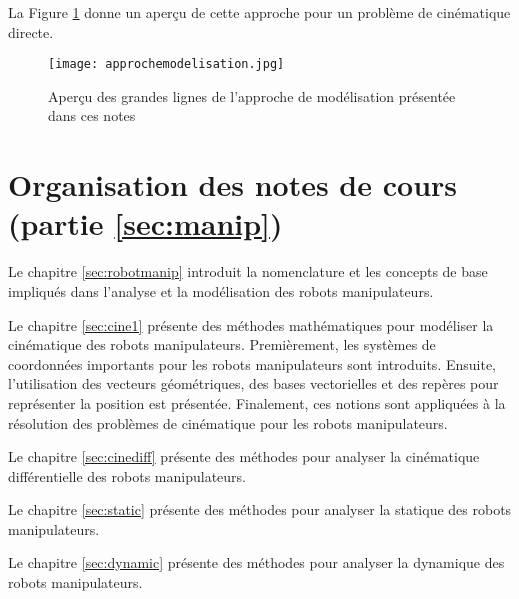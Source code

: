 La Figure \ref{fig:approchemodelisation} donne un aperçu de cette approche pour un problème de cinématique directe.

\begin{figure}[H]
	\centering
	\texttt{[image: approchemodelisation.jpg]}
	\caption{Aperçu des grandes lignes de l'approche de modélisation présentée dans ces notes}
	\label{fig:approchemodelisation}
\end{figure}

\section{Organisation des notes de cours (partie \ref{sec:manip})}

Le chapitre \ref{sec:robotmanip} introduit la nomenclature et les concepts de base impliqués dans l'analyse et la modélisation des robots manipulateurs.

Le chapitre \ref{sec:cine1} présente des méthodes mathématiques pour modéliser la cinématique des robots manipulateurs. Premièrement, les systèmes de coordonnées importants pour les robots manipulateurs sont introduits. Ensuite, l'utilisation des vecteurs géométriques, des bases vectorielles et des repères pour représenter la position est présentée. Finalement, ces notions sont appliquées à la résolution des problèmes de cinématique pour les robots manipulateurs.

Le chapitre \ref{sec:cinediff} présente des méthodes pour analyser la cinématique différentielle des robots manipulateurs.

Le chapitre \ref{sec:static} présente des méthodes pour analyser la statique des robots manipulateurs.

Le chapitre \ref{sec:dynamic} présente des méthodes pour analyser la dynamique des robots manipulateurs.
